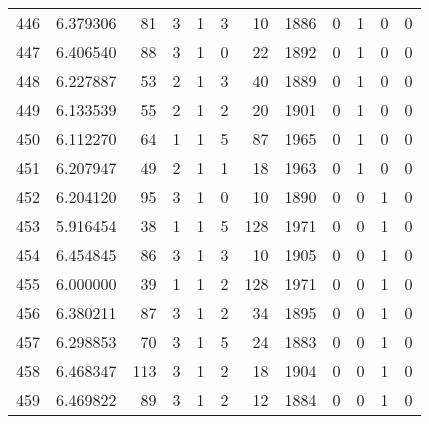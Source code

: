 \begin{tabular}{lrrrrrrrrrrr}
446 &  6.379306 &   81 &      3 &        1 &      3 &              10 &  1886 &               0 &               1 &               0 &               0 \\
447 &  6.406540 &   88 &      3 &        1 &      0 &              22 &  1892 &               0 &               1 &               0 &               0 \\
448 &  6.227887 &   53 &      2 &        1 &      3 &              40 &  1889 &               0 &               1 &               0 &               0 \\
449 &  6.133539 &   55 &      2 &        1 &      2 &              20 &  1901 &               0 &               1 &               0 &               0 \\
450 &  6.112270 &   64 &      1 &        1 &      5 &              87 &  1965 &               0 &               1 &               0 &               0 \\
451 &  6.207947 &   49 &      2 &        1 &      1 &              18 &  1963 &               0 &               1 &               0 &               0 \\
452 &  6.204120 &   95 &      3 &        1 &      0 &              10 &  1890 &               0 &               0 &               1 &               0 \\
453 &  5.916454 &   38 &      1 &        1 &      5 &             128 &  1971 &               0 &               0 &               1 &               0 \\
454 &  6.454845 &   86 &      3 &        1 &      3 &              10 &  1905 &               0 &               0 &               1 &               0 \\
455 &  6.000000 &   39 &      1 &        1 &      2 &             128 &  1971 &               0 &               0 &               1 &               0 \\
456 &  6.380211 &   87 &      3 &        1 &      2 &              34 &  1895 &               0 &               0 &               1 &               0 \\
457 &  6.298853 &   70 &      3 &        1 &      5 &              24 &  1883 &               0 &               0 &               1 &               0 \\
458 &  6.468347 &  113 &      3 &        1 &      2 &              18 &  1904 &               0 &               0 &               1 &               0 \\
459 &  6.469822 &   89 &      3 &        1 &      2 &              12 &  1884 &               0 &               0 &               1 &               0 \\

\end{tabular}
